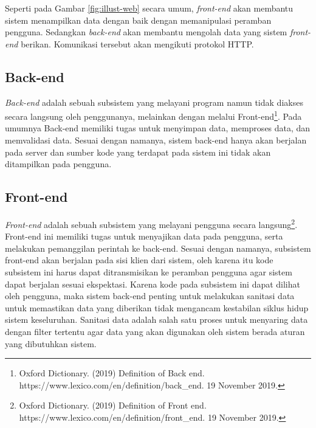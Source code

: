     Seperti pada Gambar \ref{fig:illust-web} secara umum, \textit{front-end} akan 
    membantu sistem menampilkan data dengan baik dengan memanipulasi peramban pengguna.
    Sedangkan \textit{back-end} akan membantu
    mengolah data yang sistem \textit{front-end} berikan. Komunikasi tersebut akan
    mengikuti protokol HTTP.

\subsection{Back-end}
    \textit{Back-end} adalah sebuah subsistem yang melayani program namun
    tidak diakses secara langsung oleh penggunanya, melainkan dengan melalui
    Front-end\footnote{Oxford Dictionary. (2019) Definition of Back end.
    https://www.lexico.com/en/definition/back\_end. 19 November 2019.}. Pada umumnya Back-end
    memiliki
    tugas untuk menyimpan data, memproses data, dan memvalidasi data.
    Sesuai dengan namanya, sistem back-end hanya akan berjalan pada server dan
    sumber kode yang terdapat pada sistem ini tidak akan ditampilkan pada
    pengguna.

\subsection{Front-end}
    \textit{Front-end} adalah sebuah subsistem yang melayani pengguna secara
    langsung\footnote{Oxford Dictionary. (2019) Definition of Front end.
    https://www.lexico.com/en/definition/front\_end. 19 November
    2019.}. Front-end ini memiliki tugas untuk menyajikan data pada pengguna,
    serta melakukan pemanggilan perintah ke back-end.
    Sesuai dengan namanya, subsistem front-end akan berjalan pada sisi klien
    dari sistem, oleh karena itu kode subsistem ini harus dapat ditransmisikan
    ke peramban pengguna agar sistem dapat berjalan sesuai ekspektasi. Karena
    kode pada subsistem ini dapat dilihat oleh pengguna, maka sistem back-end
    penting untuk melakukan sanitasi data untuk memastikan data yang diberikan
    tidak mengancam kestabilan siklus hidup sistem keseluruhan. Sanitasi data
    adalah salah satu proses untuk menyaring data dengan filter tertentu agar
    data yang akan digunakan oleh sistem berada aturan yang dibutuhkan sistem.

